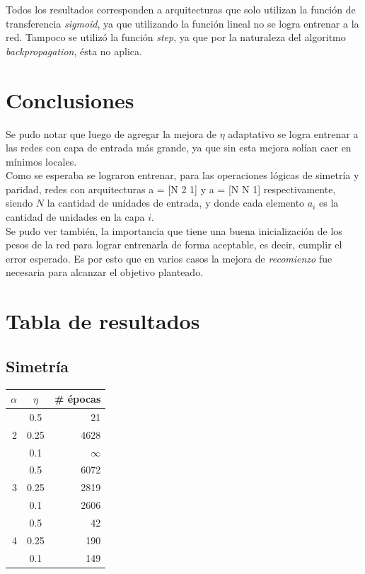 \documentclass{article}
\begin{document}
Todos los resultados corresponden a arquitecturas que solo utilizan la función de transferencia \textit{sigmoid}, 
ya que utilizando la función lineal no se logra entrenar a la red. Tampoco se utilizó la función \textit{step}, ya
que por la naturaleza del algoritmo \textit{backpropagation}, ésta no aplica.

\section{Conclusiones}
Se pudo notar que luego de agregar la mejora de $\eta$ adaptativo se logra entrenar a las redes con capa de entrada más grande, ya que sin esta mejora solían caer en mínimos locales. \\
Como se esperaba se lograron entrenar, para las operaciones lógicas de simetría y paridad, redes con arquitecturas a = [N 2 1] y a = [N N 1] respectivamente, siendo $N$ la  cantidad de unidades de entrada, y donde cada elemento $a_i$ es la cantidad de unidades en la capa $i$. \\
Se pudo ver también, la importancia que tiene una buena inicialización de los pesos de la red para lograr entrenarla de forma aceptable, es decir, cumplir el error esperado. Es por esto que en varios casos la mejora de \textit{recomienzo} fue necesaria para alcanzar el objetivo planteado. 


\clearpage
\appendix
\section{Tabla de resultados}
\subsection{Simetría}

\begin{table}[h]
\begin{center}
\begin{tabular}{|r|c|r|}
 \hline
\textbf{$\alpha$} &  \textbf{$\eta$} & \textbf{\# épocas} \\
 \hline
 \multirow{3}{*}{2}
 & 0.5 & 21 \\
 \cline{2-3}
 & 0.25 & 4628 \\
 \cline{2-3}
& 0.1 & $\infty$ \\
 \hline
 \multirow{3}{*}{3}
 & 0.5 & 6072 \\
 \cline{2-3}
 & 0.25 & 2819 \\
 \cline{2-3}
  & 0.1 & 2606 \\
 \hline
 \multirow{3}{*}{4}
  &  0.5 & 42 \\
 \cline{2-3}
  & 0.25 & 190 \\
 \cline{2-3}
  & 0.1 & 149 \\
 \hline
\end{tabular}
\end{center}
\label{simetryTable}
\end{table}
\end{document}
